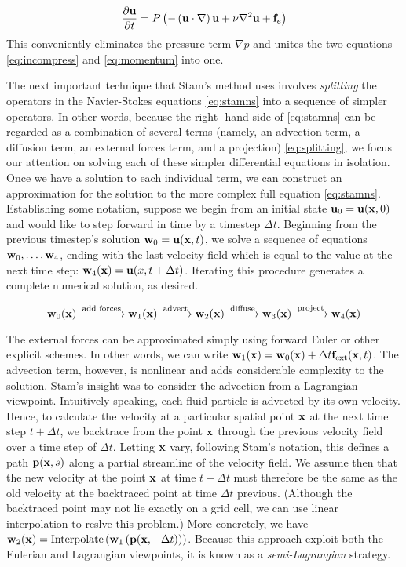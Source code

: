 \begin{equation}
\label{eq:stamns}
\frac{\partial \mathbf{u}}{\partial t} = P\left(-\left(\mathbf{u} \cdot \nabla \right)\mathbf{u} + \nu \nabla^{2}\mathbf{u} + \mathbf{f}_e\right)
\end{equation}
This conveniently eliminates the pressure term $\nabla p$ and unites the two equations \ref{eq:incompress} and \ref{eq:momentum} into one.

The next important technique that Stam's method uses involves {\em splitting} the operators in the Navier-Stokes equations \ref{eq:stamns} into a sequence of simpler operators. In other words, because the right-
hand-side of \ref{eq:stamns} can be regarded as a combination of several terms (namely, an advection term, a diffusion term, an external forces term, and a projection) \ref{eq:splitting}, we focus our attention on solving each of these simpler differential equations in isolation. Once we have a solution to each individual term, we can construct an approximation for the solution to the more complex full equation \ref{eq:stamns}. Establishing some notation, suppose we begin from an initial state $\mathbf{u}_0 = \mathbf{u}(\mathbf{x}, 0)$ and would like to step forward in time by a timestep $\Delta t$. Beginning from the previous timestep's solution $\mathbf{w}_0 = \mathbf{u}(\mathbf{x}, t)$, we solve a sequence of equations $\mathbf{w}_0, \dots, \mathbf{w}_4$, ending with the last velocity field which is equal to the value at the next time step: $\mathbf{w}_4(\mathbf{x}) = \mathbf{u}(x, t + \Delta t)$. Iterating this procedure generates a complete numerical solution, as desired.

\begin{equation}
\label{eq:splitting}
\mathbf{w}_0(\mathbf{x}) \xrightarrow{\text{add forces}} \mathbf{w}_1(\mathbf{x}) \xrightarrow{\text{advect}} \mathbf{w}_2(\mathbf{x}) \xrightarrow{\text{diffuse}} \mathbf{w}_3(\mathbf{x}) \xrightarrow{\text{project}} \mathbf{w}_4(\mathbf{x})
\end{equation}

The external forces can be approximated simply using forward Euler or other explicit schemes. In other words, we can write
$\mathbf{w}_1(\mathbf{x}) = \mathbf{w}_0(\mathbf{x}) + \Delta t \mathbf{f}_{\text{ext}}(\mathbf{x}, t)$. The advection term, however, is nonlinear and adds considerable complexity to the solution. Stam's insight was to consider the advection from a Lagrangian viewpoint. Intuitively speaking, each fluid particle is advected by its own velocity. Hence, to calculate the velocity at a particular spatial point $\mathbf{x}$ at the next time step $t + \Delta t$, we backtrace from the point $\mathbf{x}$ through the previous velocity field over a time step of $\Delta t$. Letting $\mathbf{x}$ vary, following Stam's notation, this defines a path $\mathbf{p}(\mathbf{x}, s)$ along a partial streamline of the velocity field. We assume then that the new velocity at the point $\mathbf{x}$ at time $t + \Delta t$ must therefore be the same as the old velocity at the backtraced point at time $\Delta t$ previous. (Although the backtraced point may not lie exactly on a grid cell, we can use linear interpolation to reslve this problem.) More concretely, we have $\mathbf{w}_2(\mathbf{x}) = \text{Interpolate}\left(\mathbf{w}_1\left(\mathbf{p}(\mathbf{x}, -\Delta t)\right)\right)$.
Because this approach exploit both the Eulerian and Lagrangian viewpoints, it is known as a {\em semi-Lagrangian} strategy.

